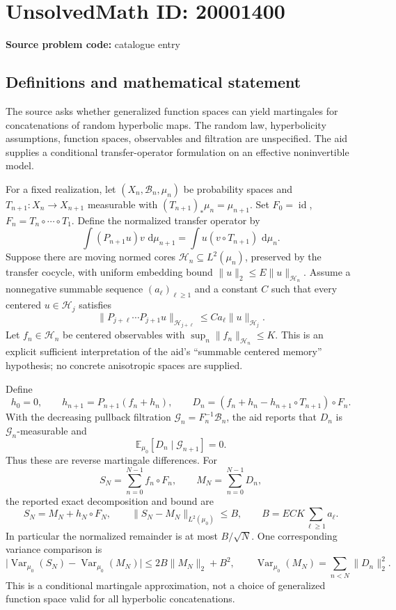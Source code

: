\documentclass[11pt]{article}
\newcommand{\E}{\mathbb{E}}
\newcommand{\dd}{\,\mathrm{d}}
\begin{document}
\section*{UnsolvedMath ID: 20001400}
\textbf{Source problem code:} catalogue entry
\subsection{Definitions and mathematical statement}
The source asks whether generalized function spaces can yield martingales for concatenations of random hyperbolic maps. The random law, hyperbolicity assumptions, function spaces, observables and filtration are unspecified. The aid supplies a conditional transfer-operator formulation on an effective noninvertible model.

For a fixed realization, let \((X_n,\mathcal B_n,\mu_n)\) be probability spaces and \(T_{n+1}:X_n\to X_{n+1}\) measurable with \((T_{n+1})_*\mu_n=\mu_{n+1}\). Set \(F_0=\operatorname{id}\), \(F_n=T_n\circ\cdots\circ T_1\). Define the normalized transfer operator by
\[
 \int(P_{n+1}u)v\,\dd\mu_{n+1}
   =\int u(v\circ T_{n+1})\,\dd\mu_n.
\]
Suppose there are moving normed cores \(\mathcal H_n\subseteq L^2(\mu_n)\), preserved by the transfer cocycle, with uniform embedding bound \(\|u\|_2\leq E\|u\|_{\mathcal H_n}\). Assume a nonnegative summable sequence \((a_\ell)_{\ell\geq1}\) and a constant \(C\) such that every centered \(u\in\mathcal H_j\) satisfies
\[
 \|P_{j+\ell}\cdots P_{j+1}u\|_{\mathcal H_{j+\ell}}
   \leq C a_\ell\|u\|_{\mathcal H_j}.
\]
Let \(f_n\in\mathcal H_n\) be centered observables with \(\sup_n\|f_n\|_{\mathcal H_n}\leq K\). This is an explicit sufficient interpretation of the aid's ``summable centered memory'' hypothesis; no concrete anisotropic spaces are supplied.

Define
\[
 h_0=0,\qquad h_{n+1}=P_{n+1}(f_n+h_n),\qquad
 D_n=(f_n+h_n-h_{n+1}\circ T_{n+1})\circ F_n.
\]
With the decreasing pullback filtration \(\mathcal G_n=F_n^{-1}\mathcal B_n\), the aid reports that \(D_n\) is \(\mathcal G_n\)-measurable and
\[
 \E_{\mu_0}[D_n\mid\mathcal G_{n+1}]=0.
\]
Thus these are reverse martingale differences. For
\[
 S_N=\sum_{n=0}^{N-1}f_n\circ F_n,\qquad
 M_N=\sum_{n=0}^{N-1}D_n,
\]
the reported exact decomposition and bound are
\[
 S_N=M_N+h_N\circ F_N,\qquad
 \|S_N-M_N\|_{L^2(\mu_0)}\leq B,
 \qquad B=ECK\sum_{\ell\geq1}a_\ell.
\]
In particular the normalized remainder is at most \(B/\sqrt N\). One corresponding variance comparison is
\[
 \bigl|\operatorname{Var}_{\mu_0}(S_N)-\operatorname{Var}_{\mu_0}(M_N)\bigr|
 \leq2B\|M_N\|_2+B^2,
 \qquad \operatorname{Var}_{\mu_0}(M_N)=\sum_{n<N}\|D_n\|_2^2.
\]
This is a conditional martingale approximation, not a choice of generalized function space valid for all hyperbolic concatenations.
\end{document}

